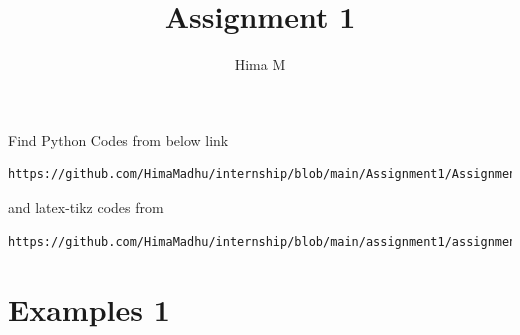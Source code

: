 \documentclass[journal,12pt,twocolumn]{IEEEtran}
\begin{document}
\providecommand{\fourier}{\overset{\mathcal{F}}{ \rightleftharpoons}}
\providecommand{\system}{\overset{\mathcal{H}}{ \longleftrightarrow}}
\newcommand{\solution}{\noindent \textbf{Solution: }}
\newcommand{\cosec}{\,\text{cosec}\,}
\providecommand{\dec}[2]{\ensuremath{\overset{#1}{\underset{#2}{\gtrless}}}}
\newcommand{\myvec}[1]{\ensuremath{\begin{pmatrix}#1\end{pmatrix}}}
\newcommand{\mydet}[1]{\ensuremath{\begin{vmatrix}#1\end{vmatrix}}}
\makeatletter
{}
\makeatother
\let\StandardTheFigure\thefigure
\let\vec\mathbf
\renewcommand{\thefigure}{\theproblem}
\def\putbox#1#2#3{\makebox[0in][l]{\makebox[#1][l]{}\raisebox{\baselineskip}[0in][0in]{\raisebox{#2}[0in][0in]{#3}}}}
     \def\rightbox#1{\makebox[0in][r]{#1}}
     \def\centbox#1{\makebox[0in]{#1}}
     \def\topbox#1{\raisebox{-\baselineskip}[0in][0in]{#1}}
     \def\midbox#1{\raisebox{-0.5\baselineskip}[0in][0in]{#1}}
\vspace{3cm}
\title{Assignment 1}
\author{Hima M}
\maketitle
\newpage
\bigskip
\renewcommand{\thefigure}{\theenumi}
\renewcommand{\thetable}{\theenumi}
Find Python Codes from below link 
%
\begin{lstlisting}
https://github.com/HimaMadhu/internship/blob/main/Assignment1/Assignment1.py
\end{lstlisting}
%
and latex-tikz codes from 
%
\begin{lstlisting}
https://github.com/HimaMadhu/internship/blob/main/assignment1/assignment%201.tex
\end{lstlisting}
%

\section{Examples 1}
\end{document}
